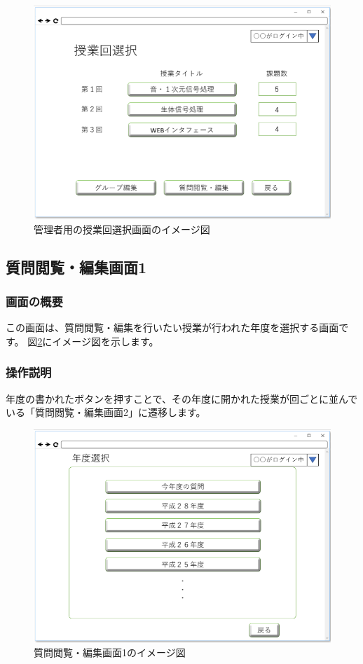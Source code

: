 \begin{figure}[htbp]
  \begin{center}
    \includegraphics[width=0.7\linewidth,clip]{./img/16.png}
    \caption{管理者用の授業回選択画面のイメージ図}\label{fig:16}
  \end{center}
\end{figure}

\newpage

\subsection{質問閲覧・編集画面1}
\subsubsection{画面の概要}
この画面は、質問閲覧・編集を行いたい授業が行われた年度を選択する画面です。
図\ref{fig:17}にイメージ図を示します。

\subsubsection{操作説明}
年度の書かれたボタンを押すことで、その年度に開かれた授業が回ごとに並んでいる「質問閲覧・編集画面2」に遷移します。

\begin{figure}[htbp]
  \begin{center}
    \includegraphics[width=0.7\linewidth,clip]{./img/17.png}
    \caption{質問閲覧・編集画面1のイメージ図}\label{fig:17}
  \end{center}
\end{figure}

